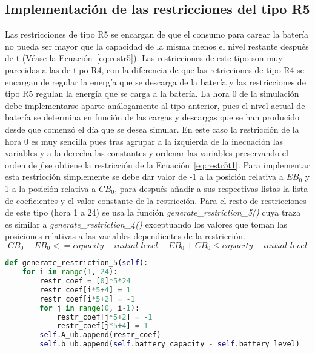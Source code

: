 \subsection{Implementación de las restricciones del tipo R5}
Las restricciones de tipo R5 se encargan de que el consumo para cargar la batería no pueda ser mayor que la capacidad de la misma menos el nivel restante después de t (Véase la Ecuación~\ref{eq:restr5}). Las restricciones de este tipo son muy parecidas a las de tipo R4, con la diferencia de que las retricciones de tipo R4 se encargan de regular la energía que se descarga de la batería y las restricciones de tipo R5 regulan la energía que se carga a la batería. La hora 0 de la simulación debe implementarse aparte análogamente al tipo anterior, pues el nivel actual de batería se determina en función de las cargas y descargas que se han producido desde que comenzó el día que se desea simular. En este caso la restricción de la hora 0 es muy sencilla pues tras agrupar a la izquierda de la inecuación las variables y a la derecha las constantes y ordenar las variables preservando el orden de \textit{f} se obtiene la restricción de la Ecuación~\ref{eq:restr5t1}. Para implementar esta restricción simplemente se debe dar valor de -1 a la posición relativa a $ EB_{0} $ y 1 a la posición relativa a $ CB_{0} $, para después añadir a sus respectivas listas la lista de coeficientes y el valor constante de la restricción. Para el resto de restricciones de este tipo (hora 1 a 24) se usa la función \textit{generate\_restriction\_5()} cuya traza es similar a \textit{generate\_restriction\_4()} exceptuando los valores que toman las posiciones relativas a las variables dependientes de la restricción.
\begin{equation}
  \label{eq:restr5t1}
  CB_{0} - EB_{0} <= capacity - initial\_level
  -EB_{0} + CB_{0} \leq capacity - initial\_level
\end{equation}
\begin{lstlisting}[language=Python,float=ht,caption={Restricciones del tipo R5},label={lst:restr5}]
def generate_restriction_5(self):
    for i in range(1, 24):
        restr_coef = [0]*5*24
        restr_coef[i*5+4] = 1
        restr_coef[i*5+2] = -1
        for j in range(0, i-1):
            restr_coef[j*5+2] = -1
            restr_coef[j*5+4] = 1
        self.A_ub.append(restr_coef)
        self.b_ub.append(self.battery_capacity - self.battery_level)
\end{lstlisting}
